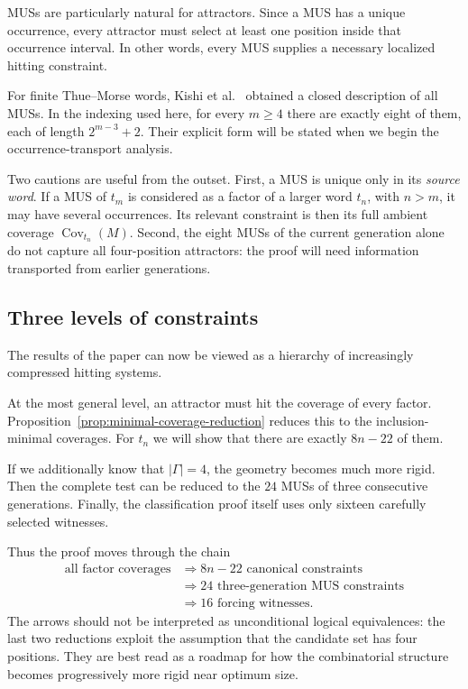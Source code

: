 \documentclass[10pt,a4paper]{article}
\theoremstyle{definition}\newtheorem{definition}[theorem]{Definition}
\theoremstyle{remark}\newtheorem{remark}[theorem]{Remark}
\newcommand{\Cov}{\operatorname{Cov}}
\begin{document}
MUSs are particularly natural for attractors. Since a MUS has a unique occurrence, every attractor must select at least one position inside that occurrence interval. In other words, every MUS supplies a necessary localized hitting constraint.

For finite Thue--Morse words, Kishi et al.~\cite{Kishi2026} obtained a closed description of all MUSs. In the indexing used here, for every $m\ge4$ there are exactly eight of them, each of length
$
2^{m-3}+2.
$
Their explicit form will be stated when we begin the occurrence-transport analysis.

Two cautions are useful from the outset. First, a MUS is unique only in its \emph{source word}. If a MUS of $t_m$ is considered as a factor of a larger word $t_n$, with $n>m$, it may have several occurrences. Its relevant constraint is then its full ambient coverage $\Cov_{t_n}(M)$. Second, the eight MUSs of the current generation alone do not capture all four-position attractors: the proof will need information transported from earlier generations.

\subsection{Three levels of constraints}
The results of the paper can now be viewed as a hierarchy of increasingly compressed hitting systems.

At the most general level, an attractor must hit the coverage of every factor. Proposition~\ref{prop:minimal-coverage-reduction} reduces this to the inclusion-minimal coverages. For $t_n$ we will show that there are exactly $8n-22$ of them.

If we additionally know that $|\Gamma|=4$, the geometry becomes much more rigid. Then the complete test can be reduced to the $24$ MUSs of three consecutive generations. Finally, the classification proof itself uses only sixteen carefully selected witnesses.

Thus the proof moves through the chain
\[
\begin{aligned}
\text{all factor coverages}
&\Longrightarrow 8n-22\text{ canonical constraints}\\
&\Longrightarrow 24\text{ three-generation MUS constraints}\\
&\Longrightarrow 16\text{ forcing witnesses}.
\end{aligned}
\]
The arrows should not be interpreted as unconditional logical equivalences: the last two reductions exploit the assumption that the candidate set has four positions. They are best read as a roadmap for how the combinatorial structure becomes progressively more rigid near optimum size.
\end{document}
